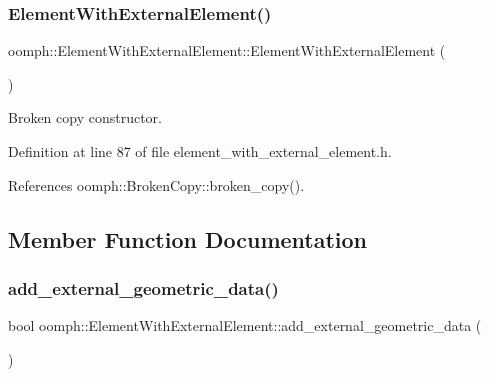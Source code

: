 \subsubsection{\texorpdfstring{Element\+With\+External\+Element()}{ElementWithExternalElement()}\hspace{0.1cm}{\footnotesize\ttfamily [2/2]}}
{\footnotesize\ttfamily oomph\+::\+Element\+With\+External\+Element\+::\+Element\+With\+External\+Element (\begin{DoxyParamCaption}\item[{const \hyperlink{classoomph_1_1ElementWithExternalElement}{Element\+With\+External\+Element} \&}]{ }\end{DoxyParamCaption})\hspace{0.3cm}{\ttfamily [inline]}}



Broken copy constructor. 



Definition at line 87 of file element\+\_\+with\+\_\+external\+\_\+element.\+h.



References oomph\+::\+Broken\+Copy\+::broken\+\_\+copy().



\subsection{Member Function Documentation}
\mbox{\label{classoomph_1_1ElementWithExternalElement_a41eabd3e3473b7f7ba1b1234ebaf0ad6}} 
\subsubsection{\texorpdfstring{add\+\_\+external\+\_\+geometric\+\_\+data()}{add\_external\_geometric\_data()}}
{\footnotesize\ttfamily bool oomph\+::\+Element\+With\+External\+Element\+::add\+\_\+external\+\_\+geometric\+\_\+data (\begin{DoxyParamCaption}{ }\end{DoxyParamCaption})\hspace{0.3cm}{\ttfamily [inline]}}



